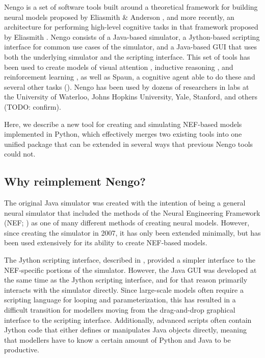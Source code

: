 \documentclass{frontiersSCNS}
\begin{document}
Nengo is a set of software tools built around
a theoretical framework for building neural models
proposed by Eliasmith \& Anderson \cite{TODO},
and more recently, an architecture
for performing high-level cognitive tasks
in that framework proposed by Eliasmith \cite{TODO}.
Nengo consists of a Java-based simulator,
a Jython-based scripting interface
for common use cases of the simulator,
and a Java-based GUI that
uses both the underlying simulator
and the scripting interface.
This set of tools has been used
to create models of visual attention \cite{TODO},
inductive reasoning \cite{TODO},
and reinforcement learning \cite{TODO},
as well as Spaun, a cognitive agent able
to do these and several other tasks
(\cite{TODO}).
Nengo has been used by dozens of researchers
in labs at the University of Waterloo,
Johns Hopkins University, Yale, Stanford,
and others (TODO: confirm).

Here, we describe a new tool
for creating and simulating NEF-based models
implemented in Python,
which effectively merges two existing tools
into one unified package
that can be extended in
several ways that previous Nengo tools could not.

\subsection{Why reimplement Nengo?}

The original Java simulator was created
with the intention of being a general
neural simulator that included
the methods of the Neural Engineering Framework
(NEF; \cite{TODO}) as one of many different
methods of creating neural models.
However, since creating the simulator in 2007,
it has only been extended minimally,
but has been used extensively for its ability
to create NEF-based models.

The Jython scripting interface,
described in \cite{TODO},
provided a simpler interface
to the NEF-specific portions of the simulator.
However, the Java GUI was developed at the same time
as the Jython scripting interface,
and for that reason primarily
interacts with the simulator directly.
Since large-scale models often require
a scripting language for looping
and parameterization,
this has resulted in a difficult transition
for modellers moving from the
drag-and-drop graphical interface
to the scripting interface.
Additionally, advanced scripts often
contain Jython code that either defines
or manipulates Java objects directly,
meaning that modellers have to know
a certain amount of Python and Java to be productive.
\end{document}
